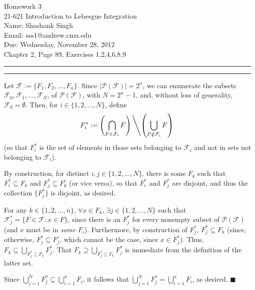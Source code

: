 \documentclass[11pt]{article}
\makeatletter
\newcounter{questionCounter}
\newcounter{partCounter}[questionCounter]
\newenvironment{question}[2][\arabic{questionCounter}]{%
    \setcounter{partCounter}{0}%
    \vspace{.25in} \hrule \vspace{0.5em}%
        \noindent{\bf #2}%
    \vspace{0.8em} \hrule \vspace{.10in}%
    \addtocounter{questionCounter}{1}%
}{}
\newcommand{\myname}{Shashank Singh}
\newcommand{\myandrew}{sss1@andrew.cmu.edu}
\newcommand{\myclass}{21-621 Introduction to Lebesgue Integration}
\newcommand{\myhwnum}{3}
\newcommand{\duedate}{Wednesday, November 28, 2012}
\newcommand{\problemlist}{Chapter 2, Page 89, Exercises 1,2,4,6,8,9}
\renewcommand{\qed}{\quad $\blacksquare$}
\newcommand{\sminus}{\backslash}
\newcommand{\pow}[1]{\mathcal{P}\left(#1\right)} %
\makeatother
\begin{document}
\thispagestyle{plain}

{\Large Homework \myhwnum} \\
\myclass \\
Name: \myname \\
Email: \myandrew \\
Due: \duedate \\
\problemlist
\begin{question}{Exercise 1}
\newcommand{\F}{\mathcal{F}}
Let $\F := \{F_1,F_2,\ldots,F_n\}$. Since
$|\pow{\F}| = 2^n$, we can enumerate the subsets $\F_0,\F_1,\ldots,\F_N$, of
$\pow{\F}$, with $N = 2^n - 1$, and, without loss of generality,
$\F_0 = \emptyset$. Then, for $i \in \{1,2,\ldots,N\}$, define
\[F^*_i
 := \left( \bigcap_{F \in \F_i} F \right)
        \left\sminus \left( \bigcup_{F \notin \F_i} F \right) \right.
\]
(so that $F^*_i$ is the set of elements in those sets belonging to $\F_i$ and
not in sets not belonging to $\F_i$).

By construction, for distinct $i,j \in \{1,2,\ldots,N\}$, there is some $F_k$
such that $F^*_i \subseteq F_k$ and $F^*_j \subseteq F^c_k$ (or vice versa),
so that $F^*_i$ and $F^*_j$ are disjoint, and thus the collection $\{F^*_j\}$
is disjoint, as desired.

For any $k \in \{1,2,\ldots,n\}$, $\forall x \in F_k$,
$\exists j \in \{1,2,\ldots,N\}$ such that $\F^*_j = \{F \in \F : x \in F\}$,
since there is an $F^*_j$ for every nonempty subset of $\pow{\F}$ (and $x$
must be in \emph{some} $F_i$). Furthermore, by construction of $F^*_j$,
$F^*_j \subseteq F_k$ (since, otherwise, $F^*_j \subseteq F^c_j$, which cannot
be the case, since $x \in F^*_j$). Thus,
$F_k \subseteq \bigcup_{F^*_j \subseteq F_k} F^*_j$. That
$F_k \supseteq \bigcup_{F^*_j \subseteq F_k} F^*_j$ is immediate from the
definition of the latter set.

Since $\bigcup_{j = 1}^{N} F^*_j \subseteq \bigcup_{i = 1}^n F_i$, it follows
that $\bigcup_{j = 1}^{N} F^*_j = \bigcup_{i = 1}^n F_i$, as desired. \qed
\end{question}
\end{document}
